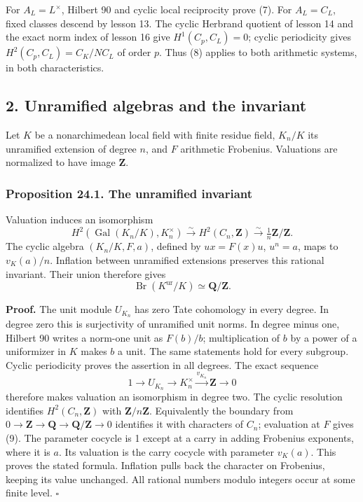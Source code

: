 \documentclass[11pt,a4paper]{article}
\begin{document}
For \(A_L=L^\times\), Hilbert 90 and cyclic local reciprocity prove (7).
For \(A_L=C_L\), fixed classes descend by lesson 13. The cyclic Herbrand
quotient of lesson 14 and the exact norm index of lesson 16 give
\(H^1(C_p,C_L)=0\); cyclic periodicity gives \(H^2(C_p,C_L)=C_K/NC_L\)
of order \(p\). Thus (8) applies to both arithmetic systems, in both
characteristics.

\subsection{2. Unramified algebras and the
invariant}\label{unramified-algebras-and-the-invariant}

Let \(K\) be a nonarchimedean local field with finite residue field,
\(K_n/K\) its unramified extension of degree \(n\), and \(F\) arithmetic
Frobenius. Valuations are normalized to have image \(\mathbf Z\).

\subsubsection{Proposition 24.1. The unramified
invariant}\label{proposition-24.1.-the-unramified-invariant}

Valuation induces an isomorphism \[
H^2(\operatorname{Gal}(K_n/K),K_n^\times)
\xrightarrow{\sim}H^2(C_n,\mathbf Z)
\xrightarrow{\sim}\tfrac1n\mathbf Z/\mathbf Z.
\tag{9}
\] The cyclic algebra \((K_n/K,F,a)\), defined by \(ux=F(x)u\),
\(u^n=a\), maps to \(v_K(a)/n\). Inflation between unramified extensions
preserves this rational invariant. Their union therefore gives \[
\operatorname{Br}(K^{\mathrm{ur}}/K)\simeq\mathbf Q/\mathbf Z.
\tag{10}
\]

\textbf{Proof.} The unit module \(U_{K_n}\) has zero Tate cohomology in
every degree. In degree zero this is surjectivity of unramified unit
norms. In degree minus one, Hilbert 90 writes a norm-one unit as
\(F(b)/b\); multiplication of \(b\) by a power of a uniformizer in \(K\)
makes \(b\) a unit. The same statements hold for every subgroup. Cyclic
periodicity proves the assertion in all degrees. The exact sequence \[
1\to U_{K_n}\to K_n^\times\xrightarrow{v_{K_n}}\mathbf Z\to0
\] therefore makes valuation an isomorphism in degree two. The cyclic
resolution identifies \(H^2(C_n,\mathbf Z)\) with
\(\mathbf Z/n\mathbf Z\). Equivalently the boundary from
\(0\to\mathbf Z\to\mathbf Q\to\mathbf Q/\mathbf Z\to0\) identifies it
with characters of \(C_n\); evaluation at \(F\) gives (9). The parameter
cocycle is 1 except at a carry in adding Frobenius exponents, where it
is \(a\). Its valuation is the carry cocycle with parameter \(v_K(a)\).
This proves the stated formula. Inflation pulls back the character on
Frobenius, keeping its value unchanged. All rational numbers modulo
integers occur at some finite level. \(\square\)
\end{document}
